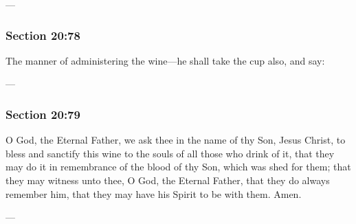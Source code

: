 		\begin{framed}
		\scriptsize
			\begin{compactdesc}
				\item[JSP] ---
				\item[RB1] 
				\item[BC] 
			\end{compactdesc}
		\end{framed}

	\subsubsection{Section 20:78} %
		\label{DC20-78}

		The manner of administering the wine---he shall take the cup also, and say:

		\begin{framed}
		\scriptsize
			\begin{compactdesc}
				\item[JSP] ---
				\item[RB1] 
				\item[BC] 
			\end{compactdesc}
		\end{framed}

	\subsubsection{Section 20:79} %
		\label{DC20-79}

		O God, the Eternal Father, we ask thee in the name of thy Son, Jesus Christ, to bless and sanctify this wine to the souls of all those who drink of it, that they may do it in remembrance of the blood of thy Son, which was shed for them; that they may witness unto thee, O God, the Eternal Father, that they do always remember him, that they may have his Spirit to be with them. Amen.

		\begin{framed}
		\scriptsize
			\begin{compactdesc}
				\item[JSP] ---
				\item[RB1] 
				\item[BC] 
			\end{compactdesc}
		\end{framed}

